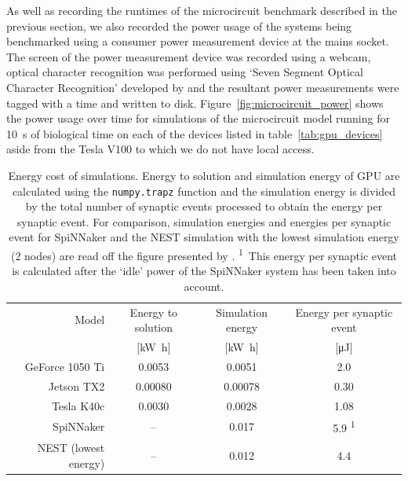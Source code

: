 \documentclass[utf8]{frontiersSCNS} %
\begin{document}
As well as recording the runtimes of the microcircuit benchmark described in the previous section, we also recorded the power usage of the systems being benchmarked using a consumer power measurement device at the mains socket.
The screen of the power measurement device was recorded using a webcam, optical character recognition was performed using `Seven Segment Optical Character Recognition' developed by \citet{Auerswald2018} and the resultant power measurements were tagged with a time and written to disk.
Figure~\ref{fig:microcircuit_power} shows the power usage over time for simulations of the microcircuit model running for \SI{10}{\second} of biological time on each of the devices listed in table~\ref{tab:gpu_devices} aside from the Tesla V100 to which we do not have local access.

\begin{table}
  \centering
  \begin{tabular}{r S S S}
    \toprule
        {Model}                 & {Energy to solution}      & {Simulation energy}       & {Energy per synaptic event} \\
                                & {[\si{\kilo\watt\hour}]}  & {[\si{\kilo\watt\hour}]}  & {[\si{\micro\joule}]} \\
    \midrule
        GeForce 1050 Ti         & 0.0053                    & 0.0051                    & 2.0 \\
        Jetson TX2              & 0.00080                   & 0.00078                   & 0.30  \\
        Tesla K40c              & 0.0030                    & 0.0028                    & 1.08 \\
        SpiNNaker               & {--}                      & 0.017                     & 5.9 \textsuperscript{1}\\
        NEST (lowest energy)    & {--}                      & 0.012                     & 4.4 \\
    \bottomrule
  \end{tabular}

  \caption{Energy cost of simulations.
  Energy to solution and simulation energy of GPU are calculated using the \lstinline{numpy.trapz} function and the simulation energy is divided by the total number of synaptic events processed to obtain the energy per synaptic event.
  For comparison, simulation energies and energies per synaptic event for SpiNNaker and the NEST simulation with the lowest simulation energy (2 nodes) are read off the figure presented by \citet{VanAlbada2018}.
  \textsuperscript{1}~This energy per synaptic event is calculated after the `idle' power of the SpiNNaker system has been taken into account.}
  \label{tab:energy_measures}
\end{table}
\end{document}
